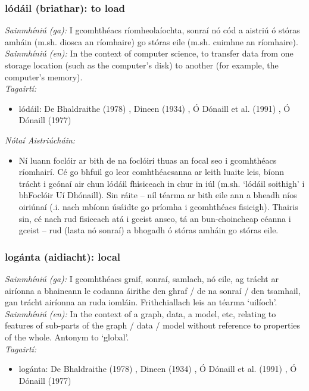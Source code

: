 \subsubsection*{lódáil (briathar): to load}
 \noindent \textit{Sainmhíniú (ga):} I gcomhthéacs ríomheolaíochta, sonraí nó cód a aistriú ó stóras amháin (m.sh. diosca an ríomhaire) go stóras eile (m.sh. cuimhne an ríomhaire).
\\
 \noindent \textit{Sainmhíniú (en):} In the context of computer science, to transfer data from one storage location (such as the computer's disk) to another (for example, the computer's memory).
\\
 \noindent \textit{Tagairtí:}
\begin{itemize}
	\item lódáil: De Bhaldraithe (1978) \cite{de-bhaldraithe}, Dineen (1934) \cite{dineen}, Ó Dónaill et al. (1991) \cite{focloir-beag}, Ó Dónaill (1977) \cite{odonaill}
\end{itemize}

 \noindent \textit{Nótaí Aistriúcháin:}
\begin{itemize}
	\item Ní luann foclóir ar bith de na foclóirí thuas an focal seo i gcomhthéacs ríomhairí. Cé go bhfuil go leor comhthéacsanna ar leith luaite leis, bíonn trácht i gcónaí air chun lódáil fhisiceach in chur in iúl (m.sh. `lódáil soithigh' i bhFoclóir Uí Dhónaill). Sin ráite -- níl téarma ar bith eile ann a bheadh níos oiriúnaí (.i. nach mbíonn úsáidte go príomha i gcomhthéacs fisicigh). Thairis sin, cé nach rud fisiceach atá i gceist anseo, tá an bun-choincheap céanna i gceist -- rud (lasta nó sonraí) a bhogadh ó stóras amháin go stóras eile.
\end{itemize}


\subsubsection*{logánta (aidiacht): local}
 \noindent \textit{Sainmhíniú (ga):} I gcomhthéacs graif, sonraí, samlach, nó eile, ag trácht ar airíonna a bhaineann le codanna áirithe den ghraf / de na sonraí / den tsamhail, gan trácht airíonna an ruda iomláin. Frithchiallach leis an téarma `uilíoch'.
\\
 \noindent \textit{Sainmhíniú (en):} In the context of a graph, data, a model, etc, relating to features of sub-parts of the graph / data / model without reference to properties of the whole. Antonym to `global'.
\\
 \noindent \textit{Tagairtí:}
\begin{itemize}
	\item logánta: De Bhaldraithe (1978) \cite{de-bhaldraithe}, Dineen (1934) \cite{dineen}, Ó Dónaill et al. (1991) \cite{focloir-beag}, Ó Dónaill (1977) \cite{odonaill}
\end{itemize}

